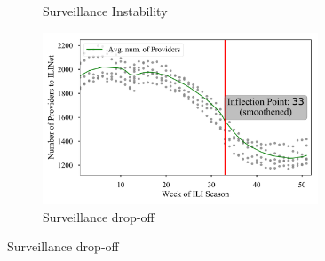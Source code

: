 \documentclass[a4paper]{article}
\begin{document}
\begin{figure}[!h]
\begin{subfigure}[t]{0.45\linewidth}
\begin{center}
    \caption{Surveillance Instability}
    \end{center}
  \end{subfigure}
  \begin{subfigure}[t]{0.45\linewidth}
    \begin{center}
    \includegraphics[width=0.9\textwidth]{./ili_surveillance_drop.png}
    \caption{Surveillance drop-off}
    \end{center}
  \end{subfigure}
  
\end{figure}
\end{document}
